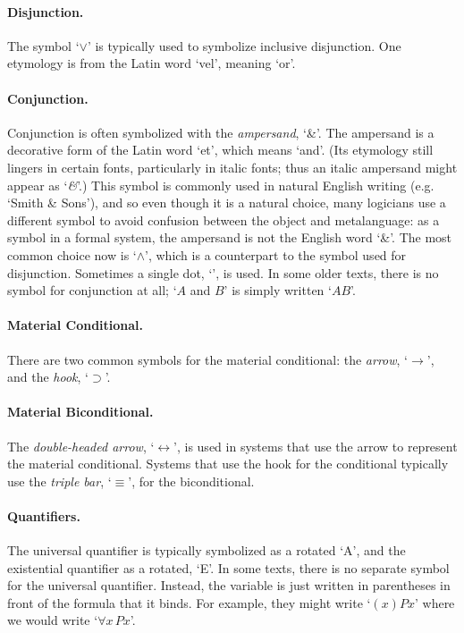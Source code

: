 \paragraph{Disjunction.} The symbol `$\vee$' is typically used to symbolize inclusive disjunction. One etymology is from the Latin word `vel', meaning `or'.%

\paragraph{Conjunction.}
Conjunction is often symbolized with the \emph{ampersand}, `{\&}'. The ampersand is a decorative form of the Latin word `et', which means `and'.  (Its etymology still lingers in certain fonts, particularly in italic fonts; thus an italic ampersand might appear as `\emph{\&}'.) This symbol is commonly used in natural English writing (e.g.  `Smith \& Sons'), and so even though it is a natural choice, many logicians use a different symbol to avoid confusion between the object and metalanguage: as a symbol in a formal system, the ampersand is not the English word `\&'. The most common choice now is `$\wedge$', which is a counterpart to the symbol used for disjunction. Sometimes a single dot, `{\scriptsize\textbullet}', is used. In some older texts, there is no symbol for conjunction at all; `$A$ and $B$' is simply written `$AB$'.

\paragraph{Material Conditional.} There are two common symbols for the material conditional: the \emph{arrow}, `$\rightarrow$', and the \emph{hook}, `$\supset$'.

\paragraph{Material Biconditional.} The \emph{double-headed arrow}, `$\leftrightarrow$', is used in systems that use the arrow to represent the material conditional. Systems that use the hook for the conditional typically use the \emph{triple bar}, `$\equiv$', for the biconditional.

\paragraph{Quantifiers.} The universal quantifier is typically symbolized as a rotated `A', and the existential quantifier as a rotated, `E'. In some texts, there is no separate symbol for the universal quantifier. Instead, the variable is just written in parentheses in front of the formula that it binds. For example, they might write `$(x)Px$' where we would write `$\forall x\, Px$'.

